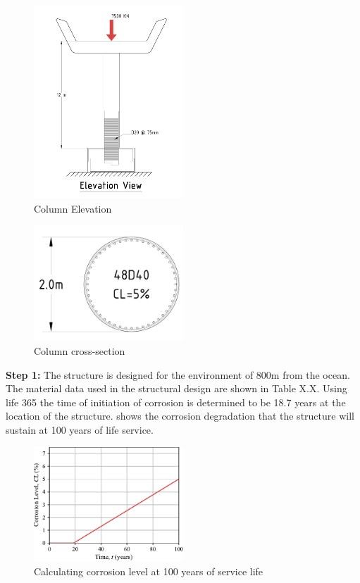 \begin{figure}[htbp]
	\centering
	\includegraphics[width=0.5\textwidth]{VAC Thesis 2.0/Chapter-6/figs/Column_Elevation.pdf}
	\caption{Column Elevation}
	\label{fig:column_elevation_design}
\end{figure}

\begin{figure}[htbp]
	\centering
	\includegraphics[width=0.5\textwidth]{VAC Thesis 2.0/Chapter-6/figs/ColumnSection_Design.pdf}
	\caption{Column cross-section}
	\label{fig:column_cross-section_design}
\end{figure}

\textbf{Step 1:} The structure is designed for the environment of 800m from the ocean. The material data used in the structural design are shown in Table X.X. Using life 365 the time of initiation of corrosion is determined to be 18.7 years at the location of the structure.  shows the corrosion degradation that the structure will sustain at 100 years of life service. 
\begin{figure}[htbp]
	\centering
	\includegraphics[width=0.5\textwidth]{VAC Thesis 2.0/Chapter-6/figs/CorrosionLevel_lifeService_5.pdf}
	\caption{Calculating corrosion level at 100 years of service life}
	\label{fig:corrosion_level_100years}
\end{figure}

